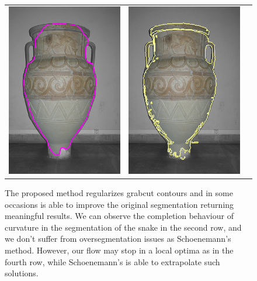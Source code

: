 \documentclass[runningheads]{llncs}
\begin{document}
\begin{figure}
\begin{tabular}{ccc}
		\includegraphics[scale=0.2]{images/segmentation/vase/corrected-seg.png} &					\includegraphics[scale=0.2]{images/segmentation/schoenemann/vase/vase-seg.png}		
	\end{tabular}
	\label{fig:segmentation-results}
	\caption{The proposed method regularizes grabcut contours and in some occasions is able to improve the original segmentation returning meaningful results. We can observe the completion behaviour of curvature in the segmentation of the snake in the second row, and we don't suffer from oversegmentation issues as Schoenemann's method. However, our flow may stop in a local optima as in the fourth row, while Schoenemann's is able to extrapolate such solutions.}
\end{figure}
\end{document}

